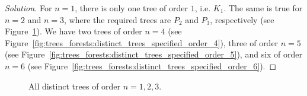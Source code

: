 \begin{proof}[Solution]
For $n = 1$, there is only one tree of order $1$, i.e. $K_1$. The same
is true for $n = 2$ and $n = 3$, where the required trees are $P_2$
and $P_3$, respectively (see
Figure~\ref{fig:trees_forests:distinct_trees_specified_order_1_2_3}). We
have two trees of order $n = 4$ (see
Figure~\ref{fig:trees_forests:distinct_trees_specified_order_4}),
three of order $n = 5$ (see
Figure~\ref{fig:trees_forests:distinct_trees_specified_order_5}), and
six of order $n = 6$ (see
Figure~\ref{fig:trees_forests:distinct_trees_specified_order_6}).
\end{proof}

\begin{figure}[!htbp]
\centering
{}
\quad
{}
\quad
{}
\caption{All distinct trees of order $n = 1, 2, 3$.}
\label{fig:trees_forests:distinct_trees_specified_order_1_2_3}
\end{figure}

